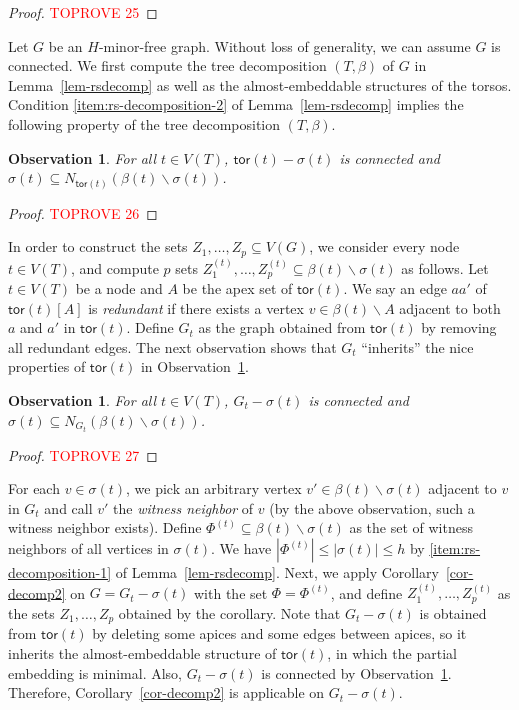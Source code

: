 \documentclass[a4paper,11pt]{article}
\numberwithin{lemma}{section}
\newtheorem{observation}[lemma]{Observation}
\newcommand{\tor}{\mathsf{tor}}
\begin{document}
\begin{proof}\textcolor{red}{TOPROVE 25}\end{proof}

Let $G$ be an $H$-minor-free graph.
Without loss of generality, we can assume $G$ is connected.
We first compute the tree decomposition $(T,\beta)$ of $G$ in Lemma~\ref{lem-rsdecomp} as well as the almost-embeddable structures of the torsos.
Condition \ref{item:rs-decomposition-2} of Lemma~\ref{lem-rsdecomp} implies the following property of the tree decomposition $(T,\beta)$.

\begin{observation} \label{obs-noadhtos}
For all $t \in V(T)$, $\tor(t) - \sigma(t)$ is connected and $\sigma(t) \subseteq N_{\tor(t)}(\beta(t) \backslash \sigma(t))$.
\end{observation}
\begin{proof}\textcolor{red}{TOPROVE 26}\end{proof}

In order to construct the sets $Z_1,\dots,Z_p \subseteq V(G)$, we consider every node $t \in V(T)$, and compute $p$ sets $Z_1^{(t)},\dots,Z_p^{(t)} \subseteq \beta(t) \backslash \sigma(t)$ as follows.
Let $t \in V(T)$ be a node and $A$ be the apex set of $\tor(t)$.
We say an edge $aa'$ of $\tor(t)[A]$ is \textit{redundant} if there exists a vertex $v \in \beta(t) \backslash A$ adjacent to both $a$ and $a'$ in $\tor(t)$.
Define $G_t$ as the graph obtained from $\tor(t)$ by removing all redundant edges.
The next observation shows that $G_t$ ``inherits'' the nice properties of $\tor(t)$ in Observation~\ref{obs-noadhtos}.

\begin{observation} \label{obs-noadhGt}
For all $t \in V(T)$, $G_t - \sigma(t)$ is connected and $\sigma(t) \subseteq N_{G_t}(\beta(t) \backslash \sigma(t))$.
\end{observation}
\begin{proof}\textcolor{red}{TOPROVE 27}\end{proof}

For each $v \in \sigma(t)$, we pick an arbitrary vertex $v' \in \beta(t) \backslash \sigma(t)$ adjacent to $v$ in $G_t$ and call $v'$ the \textit{witness neighbor} of $v$ (by the above observation, such a witness neighbor exists).
Define $\varPhi^{(t)} \subseteq \beta(t) \backslash \sigma(t)$ as the set of witness neighbors of all vertices in $\sigma(t)$.
We have $|\varPhi^{(t)}| \leq |\sigma(t)| \leq h$ by \ref{item:rs-decomposition-1} of Lemma~\ref{lem-rsdecomp}.
Next, we apply Corollary~\ref{cor-decomp2} on $G = G_t - \sigma(t)$ with the set $\varPhi = \varPhi^{(t)}$, and define $Z_1^{(t)},\dots,Z_p^{(t)}$ as the sets $Z_1,\dots,Z_p$ obtained by the corollary.
Note that $G_t - \sigma(t)$ is obtained from $\tor(t)$ by deleting some apices and some edges between apices, so it inherits the almost-embeddable structure of $\tor(t)$, in which the partial embedding is minimal.
Also, $G_t - \sigma(t)$ is connected by Observation~\ref{obs-noadhtos}.
Therefore, Corollary~\ref{cor-decomp2} is applicable on $G_t - \sigma(t)$.
\end{document}
